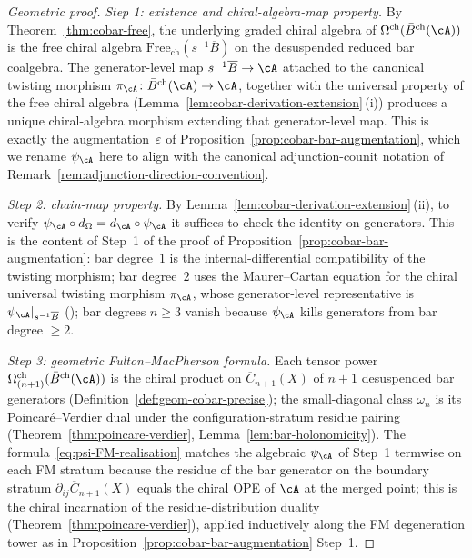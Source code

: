 \begin{proof}[Geometric proof]
\emph{Step 1: existence and chiral-algebra-map property.}
By Theorem~\ref{thm:cobar-free}, the underlying graded chiral algebra of
$\Omega^{\mathrm{ch}}(\bar{B}^{\mathrm{ch}}(\cA))$ is the free chiral algebra
$\mathrm{Free}_{\mathrm{ch}}(s^{-1}\overline{B})$ on the desuspended reduced
bar coalgebra. The generator-level map
$s^{-1}\overline B\to\cA$ attached to the canonical twisting morphism
$\pi_{\cA}\colon\bar B^{\mathrm{ch}}(\cA)\to\cA$,
together with the universal property of the free chiral algebra
\textup{(}Lemma~\ref{lem:cobar-derivation-extension}\,(i)\textup{)} produces
a unique chiral-algebra morphism extending that generator-level map. This is exactly the
augmentation~$\varepsilon$ of
Proposition~\ref{prop:cobar-bar-augmentation}, which we rename
$\psi_{\cA}$ here to align with the canonical adjunction-counit notation of
Remark~\ref{rem:adjunction-direction-convention}.

\emph{Step 2: chain-map property.}
By Lemma~\ref{lem:cobar-derivation-extension}\,(ii), to verify
$\psi_{\cA} \circ d_\Omega = d_{\cA} \circ \psi_{\cA}$ it suffices to check
the identity on generators. This is the content of Step~1 of the proof of
Proposition~\ref{prop:cobar-bar-augmentation}: bar degree~$1$ is the
internal-differential compatibility of the twisting morphism; bar
degree~$2$ uses the Maurer--Cartan equation for the chiral universal
twisting morphism
$\pi_{\cA}$, whose generator-level representative is
$\psi_{\cA}|_{s^{-1}\overline{B}}$
\textup{(}\cite[\S2.2, Proposition~2.2.6]{LV12}\textup{)}; bar degrees
$n \geq 3$ vanish because $\psi_{\cA}$ kills generators from bar
degree $\geq 2$.

\emph{Step 3: geometric Fulton--MacPherson formula.}
Each tensor power $\Omega^{\mathrm{ch}}_{(n+1)}(\bar{B}^{\mathrm{ch}}(\cA))$
is the chiral product on $\overline{C}_{n+1}(X)$ of $n+1$ desuspended bar
generators
\textup{(}Definition~\ref{def:geom-cobar-precise}\textup{)}; the
small-diagonal class $\omega_n$ is its Poincar\'e--Verdier dual under the
configuration-stratum residue pairing
\textup{(}Theorem~\ref{thm:poincare-verdier},
Lemma~\ref{lem:bar-holonomicity}\textup{)}.
The formula~\eqref{eq:psi-FM-realisation} matches the algebraic $\psi_{\cA}$
of Step~1 termwise on each FM stratum because the residue of the bar
generator on the boundary stratum $\partial_{ij}\overline{C}_{n+1}(X)$
equals the chiral OPE of $\cA$ at the merged point; this is the chiral
incarnation of the residue-distribution duality
\textup{(}Theorem~\ref{thm:poincare-verdier}\textup{)}, applied
inductively along the FM degeneration tower as in
Proposition~\ref{prop:cobar-bar-augmentation} Step~1.


\end{proof}
